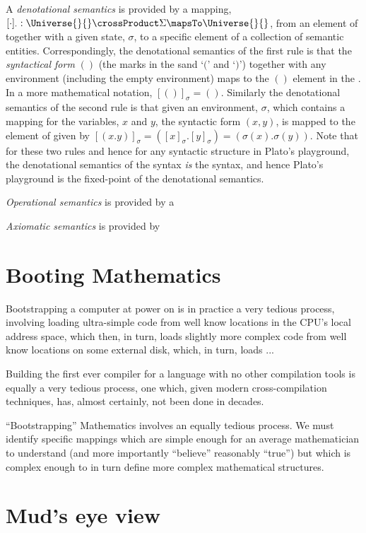 A \emph{denotational semantics} is provided by a mapping, $[ \cdot ]_{\cdot} :
\Universe{}{} \crossProduct \Sigma \mapsTo \Universe{}{}$, from an element of
\Universe{}{} together with a given state, $\sigma$, to a specific element of a
collection of semantic entities. Correspondingly, the denotational semantics of
the first rule is that the \emph{syntactical form} $()$ (the marks in the sand
`$($' and `$)$') together with any environment (including the empty environment)
maps to the $()$ element in the \Universe{}{}. In a more mathematical notation,
$[()]_{\sigma} = ()$. Similarly the denotational semantics of the second rule is
that given an environment, $\sigma$, which contains a mapping for the variables,
$x$ and $y$, the syntactic form $(x , y)$, is mapped to the element of
\Universe{}{} given by $[ ( x . y ) ]_{\sigma} = ( [x]_{\sigma} . [y]_{\sigma} )
= ( \sigma(x) . \sigma(y) )$. Note that for these two rules and hence for any
syntactic structure in Plato's playground, the denotational semantics of the
syntax \emph{is} the syntax, and hence Plato's playground is the fixed-point of
the denotational semantics.

\emph{Operational semantics} is provided by a 

\emph{Axiomatic semantics} is provided by

\section{Booting Mathematics}

Bootstrapping a computer at power on is in practice a very tedious process,
involving loading ultra-simple code from well know locations in the CPU's local
address space, which then, in turn, loads slightly more complex code from well
know locations on some external disk, which, in turn, loads ...

Building the first ever compiler for a language with no other compilation tools
is equally a very tedious process, one which, given modern cross-compilation
techniques, has, almost certainly, not been done in decades.

``Bootstrapping'' Mathematics involves an equally tedious process. We must
identify specific mappings which are simple enough for an average mathematician
to understand (and more importantly ``believe'' reasonably ``true'') but which
is complex enough to in turn define more complex mathematical structures.

\section{Mud's eye view}

